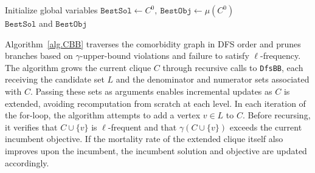 \begin{algorithm}[htpb]
        Initialize global variables $\texttt{BestSol}\gets C^0,\
        \texttt{BestObj} \gets \mu(C^0)$ \\
    \Return $\texttt{BestSol}$ and $\texttt{BestObj}$
\caption{CBB for the Maximum Mortality Rate Clique Problem}
\label{alg.CBB}
\end{algorithm}

Algorithm~\ref{alg.CBB} traverses the comorbidity graph in DFS order
and prunes branches based on $\gamma$-upper-bound violations and
failure to satisfy $\ell$-frequency. The algorithm grows the current
clique $C$ through recursive calls to \texttt{DfsBB}, each receiving
the candidate set $L$ and the denominator and numerator sets
associated with $C$. Passing these sets as arguments enables
incremental updates as $C$ is extended, avoiding recomputation from
scratch at each level. In each iteration of the for-loop, the
algorithm attempts to add a vertex $v \in L$ to $C$. Before recursing,
it verifies that $C \cup \{v\}$ is $\ell$-frequent and that
$\gamma(C \cup \{v\})$ exceeds the current incumbent objective. If
the mortality rate of the extended clique itself also improves upon
the incumbent, the incumbent solution and objective are updated
accordingly.

